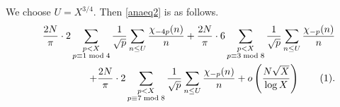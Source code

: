 \documentclass[a4paper, 11pt]{article}
\theoremstyle{plain}
\newcommand{\?}{\textcolor{red}{??}}
\begin{document}
We choose $U=X^{3/4}$. Then \eqref{anaeq2} is as follow\textcolor{black}{s}.
\begin{align*}
\label{anaeq3}
   && \frac{2N}{\pi} \cdot 2 \sum_{\substack{p<X \\ p \equiv 1 \bmod 4}}\frac{1}{\sqrt{p}} \sum_{n \le U}\frac{{\chi}_{-4p}(n)}{n}+  \frac{2N}{\pi} \cdot 6 \sum_{\substack{p<X \\ p \equiv 3 \bmod 8 }} \frac{1}{\sqrt{p}}\sum_{n \le U} \frac{{\chi}_{-p}(n)}{n} \\ 
   && + \frac{2N}{\pi} \cdot 2\sum_{\substack{p<X \\ p \equiv 7 \bmod 8 }}\frac{1}{\sqrt{p}}\sum_{n \le U}\frac{{\chi}_{-p}(n)}{n} 
    + o \left( \frac{N\sqrt{X}}{\log X} \right)
     \stepcounter{equation}\tag{\theequation} .
\end{align*}
\end{document}
